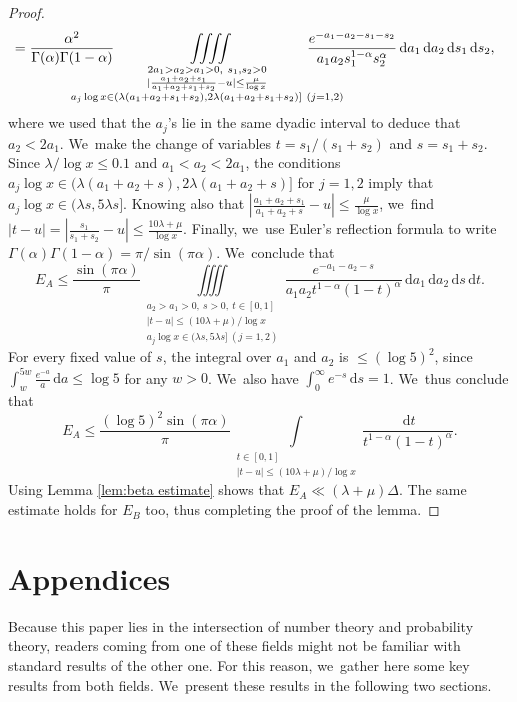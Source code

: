 \documentclass[JEP,XML,SOM,Unicode,published]{cedram}
\newcommand{\dee}{\,\mathrm{d}}
\theoremstyle{plain}
\theoremstyle{definition}
\begin{document}
\begin{proof}
\[\begin{split}
&= \frac{\alpha^2}{\Gamma(\alpha)\Gamma(1-\alpha)} \mkern-50mu \iiiint\limits_{
\substack{
2a_1>a_2>a_1>0,\ s_1,s_2>0 \\
| \frac{a_1+a_2+s_1}{a_1+a_2+s_1+s_2} - u |\le \frac{\mu}{\log x} \\
a_j\log x \in (\lambda (a_1+a_2+s_1+s_2),2\lambda (a_1+a_2+s_1+s_2)] \ (j=1,2)
} }
\mkern-50mu\frac{e^{-a_1-a_2-s_1-s_2}}
{a_1a_2s_1^{1-\alpha}s_2^\alpha}\dee a_1\dee a_2 \dee s_1\dee s_2,
\end{split}
\]
where we used that the $a_j$'s lie in the same dyadic interval to deduce that $a_2<2a_1$. We~make the change of variables $t=s_1/(s_1+s_2)$ and $s=s_1+s_2$. Since $\lambda/\log x\le 0.1$ and $a_1<a_2<2a_1$, the conditions $a_j\log x \in (\lambda (a_1+a_2+s),2\lambda (a_1+a_2+s)]$ for $j=1,2$ imply that $a_j\log x \in(\lambda s,5\lambda s]$. Knowing also that $ |\frac{a_1+a_2+s_1}{a_1+a_2+s} - u |\le \frac{\mu}{\log x}$, we~find $|t-u|=|\frac{s_1}{s_1+s_2} - u|\le \frac{10\lambda+\mu}{\log x}$. Finally, we~use Euler's reflection formula to write $\Gamma(\alpha)\Gamma(1-\alpha)=\pi/\sin(\pi\alpha)$. We~conclude that
\[
E_A \le \frac{\sin(\pi \alpha)}{\pi}
\iiiint\limits_{
\substack{
a_2>a_1>0,\ s>0,\ t\in[0,1] \\
| t-u|\le (10\lambda+\mu)/\log x\\
a_j\log x \in (\lambda s, 5\lambda s] \ (j=1,2)
} }
\frac{e^{-a_1-a_2-s}}
{a_1a_2t^{1-\alpha}(1-t)^\alpha}\dee a_1\dee a_2 \dee s\dee t.
\]
For every fixed value of $s$, the integral over $a_1$ and $a_2$ is $\le(\log 5)^2$, since $\int_w^{5w}\frac{e^{-a}}{a}\dee a \le \log5$ for any $w>0$. We~also have $\int_0^\infty e^{-s}\dee s=1$. We~thus conclude that
\[
E_A\le \frac{(\log 5)^2\sin(\pi \alpha) }{\pi} \int\limits_{\substack{t\in[0,1] \\ |t-u|\le (10\lambda+\mu)/\log x}} \frac{\dee t}{t^{1-\alpha}(1-t)^\alpha}.
\]
Using Lemma \ref{lem:beta estimate} shows that $E_A\ll (\lambda+\mu)\Delta$. The same estimate holds for $E_B$ too, thus completing the proof of the lemma.
\end{proof}

\part{Appendices}
\appendix

Because this paper lies in the intersection of number theory and probability theory, readers coming from one of these fields might not be familiar with standard results of the other one. For this reason, we~gather here some key results from both fields. We~present these results in the following two sections.
\end{document}
